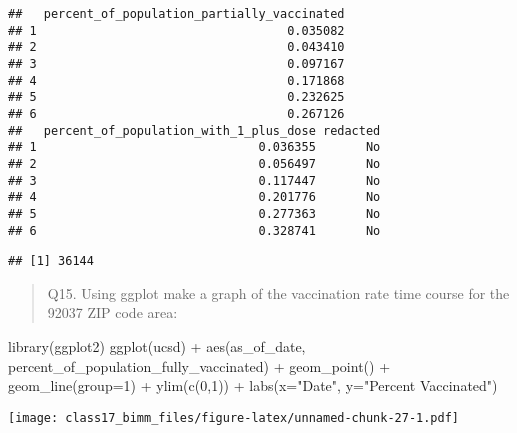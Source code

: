 \documentclass[
]{article}
\newenvironment{Shaded}{\begin{snugshade}}{\end{snugshade}}
\newcommand{\AttributeTok}[1]{\textcolor[rgb]{0.77,0.63,0.00}{#1}}
\newcommand{\DecValTok}[1]{\textcolor[rgb]{0.00,0.00,0.81}{#1}}
\newcommand{\FunctionTok}[1]{\textcolor[rgb]{0.00,0.00,0.00}{#1}}
\newcommand{\NormalTok}[1]{#1}
\newcommand{\SpecialCharTok}[1]{\textcolor[rgb]{0.00,0.00,0.00}{#1}}
\newcommand{\StringTok}[1]{\textcolor[rgb]{0.31,0.60,0.02}{#1}}
\begin{document}
\begin{verbatim}
##   percent_of_population_partially_vaccinated
## 1                                   0.035082
## 2                                   0.043410
## 3                                   0.097167
## 4                                   0.171868
## 5                                   0.232625
## 6                                   0.267126
##   percent_of_population_with_1_plus_dose redacted
## 1                               0.036355       No
## 2                               0.056497       No
## 3                               0.117447       No
## 4                               0.201776       No
## 5                               0.277363       No
## 6                               0.328741       No
\end{verbatim}

\begin{Shaded}
\end{Shaded}

\begin{verbatim}
## [1] 36144
\end{verbatim}

\begin{quote}
Q15. Using ggplot make a graph of the vaccination rate time course for
the 92037 ZIP code area:
\end{quote}

\begin{Shaded}
\begin{Highlighting}[]
\FunctionTok{library}\NormalTok{(ggplot2)}
\FunctionTok{ggplot}\NormalTok{(ucsd) }\SpecialCharTok{+}
\FunctionTok{aes}\NormalTok{(as\_of\_date,}
\NormalTok{percent\_of\_population\_fully\_vaccinated) }\SpecialCharTok{+}
\FunctionTok{geom\_point}\NormalTok{() }\SpecialCharTok{+}
\FunctionTok{geom\_line}\NormalTok{(}\AttributeTok{group=}\DecValTok{1}\NormalTok{) }\SpecialCharTok{+}
\FunctionTok{ylim}\NormalTok{(}\FunctionTok{c}\NormalTok{(}\DecValTok{0}\NormalTok{,}\DecValTok{1}\NormalTok{)) }\SpecialCharTok{+}
\FunctionTok{labs}\NormalTok{(}\AttributeTok{x=}\StringTok{"Date"}\NormalTok{, }\AttributeTok{y=}\StringTok{"Percent Vaccinated"}\NormalTok{)}
\end{Highlighting}
\end{Shaded}

\texttt{[image: class17\_bimm\_files/figure-latex/unnamed-chunk-27-1.pdf]}
\end{document}
